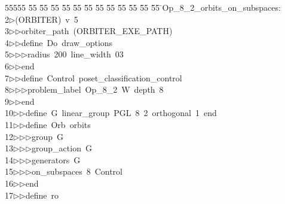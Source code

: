 %
%
\begin{tabbing}
55555 \= 55 \= 55 \= 55 \= 55 \= 55 \= 55 \= 55 \= 55 \= 55 \= 55 \= 55 \= 55 \= \>Op\_8\_2\_orbits\_on\_subspaces:\\[0pt]
2\>$\triangleright$\>(ORBITER)\ v\ 5\ \\[0pt]
3\>$\triangleright$\>$\triangleright$\>orbiter\_path\ (ORBITER\_EXE\_PATH)\ \\[0pt]
4\>$\triangleright$\>$\triangleright$\>define\ Do\ draw\_options\ \\[0pt]
5\>$\triangleright$\>$\triangleright$\>$\triangleright$\>radius\ 200\ line\_width\ 03\ \\[0pt]
6\>$\triangleright$\>$\triangleright$\>end\ \\[0pt]
7\>$\triangleright$\>$\triangleright$\>define\ Control\ poset\_classification\_control\ \\[0pt]
8\>$\triangleright$\>$\triangleright$\>$\triangleright$\>problem\_label\ Op\_8\_2\ W\ depth\ 8\ \\[0pt]
9\>$\triangleright$\>$\triangleright$\>end\ \\[0pt]
10\>$\triangleright$\>$\triangleright$\>define\ G\ linear\_group\ PGL\ 8\ 2\ orthogonal\ 1\ end\ \\[0pt]
11\>$\triangleright$\>$\triangleright$\>define\ Orb\ orbits\ \\[0pt]
12\>$\triangleright$\>$\triangleright$\>$\triangleright$\>group\ G\ \\[0pt]
13\>$\triangleright$\>$\triangleright$\>$\triangleright$\>group\_action\ G\ \\[0pt]
14\>$\triangleright$\>$\triangleright$\>$\triangleright$\>generators\ G\ \\[0pt]
15\>$\triangleright$\>$\triangleright$\>$\triangleright$\>on\_subspaces\ 8\ Control\ \\[0pt]
16\>$\triangleright$\>$\triangleright$\>end\ \\[0pt]
17\>$\triangleright$\>$\triangleright$\>define\ ro\ \\[0pt]

\end{tabbing}
